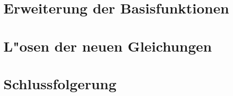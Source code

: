 \begin{refsection}
\section{Erweiterung der Basisfunktionen\label{section:lorenz2:basic_function}}

\section{L"osen der neuen Gleichungen\label{section:lorenz2:new_equations}}




\section{Schlussfolgerung}

\printbibliography[heading=subbibliography]
\end{refsection}
